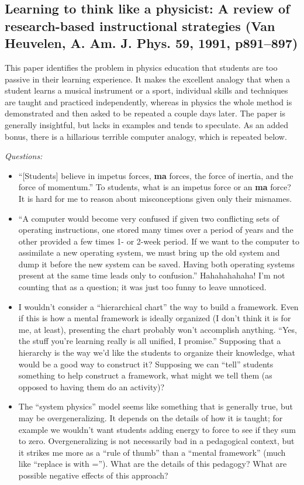 \documentclass[12pt]{article}
\begin{document}
\subsection*{Learning to think like a physicist: A review of
research-based instructional strategies (Van Heuvelen, A. Am. J. Phys.
59, 1991, p891--897)}

This paper identifies the problem in physics education that students are
too passive in their learning experience.  It makes the excellent
analogy that when a student learns a musical instrument or a sport,
individual skills and techniques are taught and practiced independently,
whereas in physics the whole method is demonstrated and then asked to be
repeated a couple days later.  The paper is generally insightful, but
lacks in examples and tends to speculate.  As an added bonus, there is
a hillarious terrible computer analogy, which is repeated below.

\textit{Questions:}

\begin{itemize}
\item ``[Students] believe in impetus forces, \textbf{ma} forces, the
force of inertia, and the force of momentum.''  To students, what is an
impetus force or an \textbf{ma} force?  It is hard for me to reason
about misconceptions given only their misnames.
\item ``A computer would become very confused if given two conflicting
sets of operating instructions, one stored many times over a period of
years and the other provided a few times 1- or 2-week period.  If we
want to the computer to assimilate a new operating system, we must bring
up the old system and dump it before the new system can be saved.
Having both operating systems present at the same time leads only to
confusion.''  Hahahahahaha!  I'm not counting that as a question; it was
just too funny to leave unnoticed.
\item I wouldn't consider a ``hierarchical chart'' the way to build a
framework.  Even if this is how a mental framework is ideally organized
(I don't think it is for me, at least), presenting the chart probably won't
accomplish anything.  ``Yes, the stuff you're learning really is all
unified, I promise.''  Supposing that a hierarchy is the way we'd like
the students to organize their knowledge, what would be a good way to
construct it?  Supposing we can ``tell'' students something to help
construct a framework, what might we tell them (as opposed to having
them do an activity)?
\item The ``system physics'' model seems like something that is
generally true, but may be overgeneralizing.  It depends on the details
of how it is taught; for example we wouldn't want students adding energy
to force to see if they sum to zero.  Overgeneralizing is not
necessarily bad in a pedagogical context, but it strikes me more as a
``rule of thumb'' than a ``mental framework'' (much like ``replace is
with ='').  What are the details of this pedagogy?  What are possible
negative effects of this approach?
\end{itemize}
\end{document}
